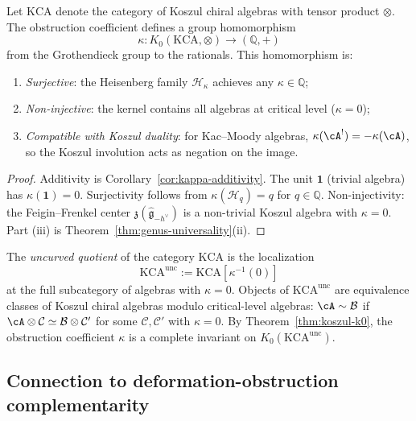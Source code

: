 \begin{theorem}
\label{thm:koszul-k0}
Let $\mathrm{KCA}$ denote the category of Koszul chiral algebras with tensor product $\otimes$. The obstruction coefficient defines a group homomorphism
\[
\kappa: K_0(\mathrm{KCA}, \otimes) \to (\mathbb{Q}, +)
\]
from the Grothendieck group to the rationals. This homomorphism is:
\begin{enumerate}[label=\textup{(\roman*)}]
\item \emph{Surjective}: the Heisenberg family $\mathcal{H}_\kappa$ achieves any $\kappa \in \mathbb{Q}$;
\item \emph{Non-injective}: the kernel contains all algebras at critical level ($\kappa = 0$);
\item \emph{Compatible with Koszul duality}: for Kac--Moody algebras, $\kappa(\cA^!) = -\kappa(\cA)$, so the Koszul involution acts as negation on the image.
\end{enumerate}
\end{theorem}

\begin{proof}
Additivity is Corollary~\ref{cor:kappa-additivity}. The unit $\mathbf{1}$ (trivial algebra) has $\kappa(\mathbf{1}) = 0$. Surjectivity follows from $\kappa(\mathcal{H}_q) = q$ for $q \in \mathbb{Q}$. Non-injectivity: the Feigin--Frenkel center $\mathfrak{z}(\widehat{\mathfrak{g}}_{-h^\vee})$ is a non-trivial Koszul algebra with $\kappa = 0$. Part (iii) is Theorem~\ref{thm:genus-universality}(ii).
\end{proof}

\begin{definition}\label{def:uncurved-quotient}
The \emph{uncurved quotient} of the category $\mathrm{KCA}$ is the localization
\[
\mathrm{KCA}^{\mathrm{unc}} := \mathrm{KCA}[\kappa^{-1}(0)]
\]
at the full subcategory of algebras with $\kappa = 0$. Objects of $\mathrm{KCA}^{\mathrm{unc}}$ are equivalence classes of Koszul chiral algebras modulo critical-level algebras: $\cA \sim \mathcal{B}$ if $\cA \otimes \mathcal{C} \simeq \mathcal{B} \otimes \mathcal{C}'$ for some $\mathcal{C}, \mathcal{C}'$ with $\kappa = 0$. By Theorem~\ref{thm:koszul-k0}, the obstruction coefficient $\kappa$ is a complete invariant on $K_0(\mathrm{KCA}^{\mathrm{unc}})$.
\end{definition}

\subsection{Connection to deformation-obstruction complementarity}
\label{subsec:obstruction-deformation-connection}

